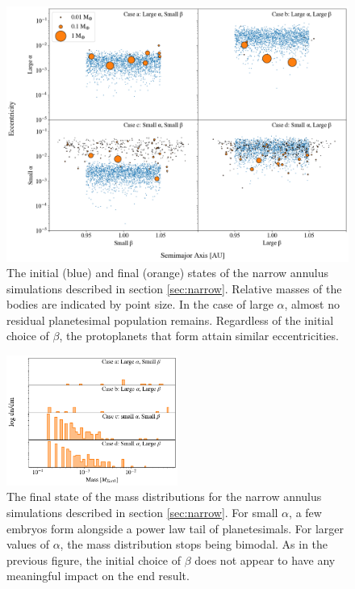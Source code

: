 \documentclass[twocolumn,linenumbers]{aastex63}
\begin{document}
\begin{figure}
\begin{center}
    \includegraphics[width=\textwidth]{figures/alpha_beta.png}
    \caption{The initial (blue) and final (orange) states of the narrow annulus simulations described in section \ref{sec:narrow}. 
    Relative masses of the bodies are indicated by point size. In the case of large $\alpha$, almost no residual planetesimal 
    population remains. Regardless of the initial choice of $\beta$, the protoplanets that form attain similar eccentricities. 
    \label{fig:alpha_beta}}
\end{center}
\end{figure}

\begin{figure}
\begin{center}
    \includegraphics[width=0.5\textwidth]{figures/alpha_beta_mass.png}
    \caption{The final state of the mass distributions for the
      narrow annulus simulations described in section \ref{sec:narrow}. For small
      $\alpha$, a few embryos form alongside a power law tail of
      planetesimals. For larger values of $\alpha$, the mass distribution stops being bimodal. 
      As in the previous figure, the initial choice of $\beta$ does not appear to have any meaningful impact on the end result.
      \label{fig:alpha_beta_mass}}
\end{center}
\end{figure}
\end{document}
